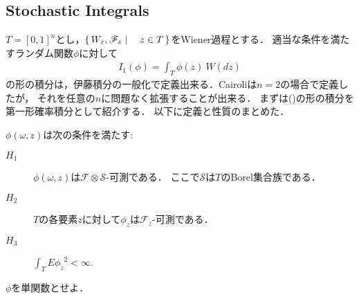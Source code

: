 \subsection{Stochastic Integrals}
	$T=[0,1]^{n}$とし，$\left\{\, W_{z},\mathscr{F}_{z} \mid \quad z \in T\, \right\}$をWiener過程とする．
	適当な条件を満たすランダム関数$\phi$に対して
	\begin{align}
		I_{1}(\phi) = \int_{T} \phi(z)\ W(dz)
		\label{fom:Stochastic_Integrals_1}
	\end{align}
	の形の積分は，伊藤積分の一般化で定義出来る．Cairoliは$n=2$の場合で定義したが，
	それを任意の$n$に問題なく拡張することが出来る．
	まずは()の形の積分を第一形確率積分として紹介する．
	以下に定義と性質のまとめた．
	
	$\phi(\omega,z)$は次の条件を満たす:
	\begin{description}
		\item[$H_{1}$] $\phi(\omega,z)$は$\mathscr{F} \otimes \mathscr{S}$-可測である．
			ここで$\mathscr{S}$は$T$のBorel集合族である．
			
		\item[$H_{2}$] $T$の各要素$z$に対して$\phi_{z}$は$\mathscr{F}_{z}$-可測である．
		
		\item[$H_{3}$] $\int_{T} E{\phi_{z}}^{2} < \infty$.
	\end{description}
	
	$\phi$を単関数とせよ．